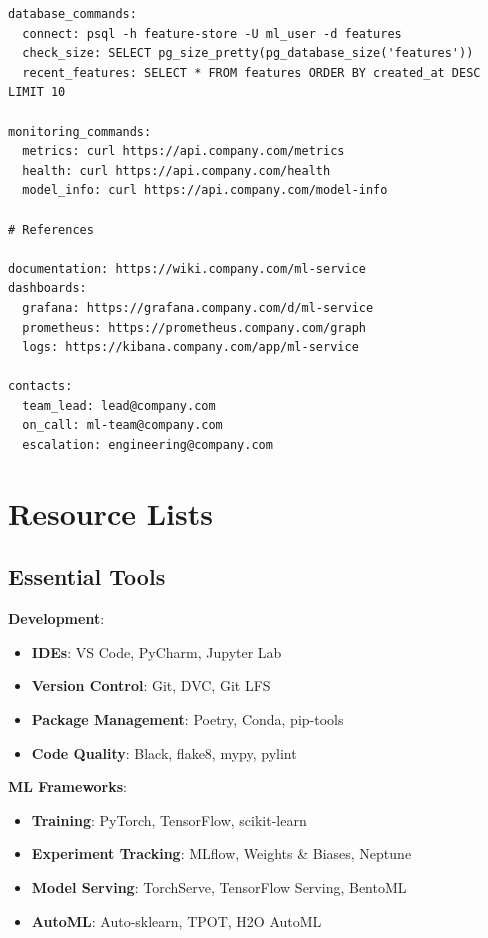 \begin{lstlisting}[style=yaml, caption={runbook.yml}]
database_commands:
  connect: psql -h feature-store -U ml_user -d features
  check_size: SELECT pg_size_pretty(pg_database_size('features'))
  recent_features: SELECT * FROM features ORDER BY created_at DESC LIMIT 10

monitoring_commands:
  metrics: curl https://api.company.com/metrics
  health: curl https://api.company.com/health
  model_info: curl https://api.company.com/model-info

# References

documentation: https://wiki.company.com/ml-service
dashboards:
  grafana: https://grafana.company.com/d/ml-service
  prometheus: https://prometheus.company.com/graph
  logs: https://kibana.company.com/app/ml-service

contacts:
  team_lead: lead@company.com
  on_call: ml-team@company.com
  escalation: engineering@company.com
\end{lstlisting}

\section{Resource Lists}

\subsection{Essential Tools}

\textbf{Development}:
\begin{itemize}
    \item \textbf{IDEs}: VS Code, PyCharm, Jupyter Lab
    \item \textbf{Version Control}: Git, DVC, Git LFS
    \item \textbf{Package Management}: Poetry, Conda, pip-tools
    \item \textbf{Code Quality}: Black, flake8, mypy, pylint
\end{itemize}

\textbf{ML Frameworks}:
\begin{itemize}
    \item \textbf{Training}: PyTorch, TensorFlow, scikit-learn
    \item \textbf{Experiment Tracking}: MLflow, Weights \& Biases, Neptune
    \item \textbf{Model Serving}: TorchServe, TensorFlow Serving, BentoML
    \item \textbf{AutoML}: Auto-sklearn, TPOT, H2O AutoML
\end{itemize}

